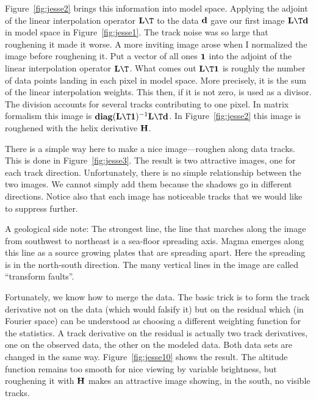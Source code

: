 \par
Figure~\ref{fig:jesse2} brings this information into model space.
Applying the adjoint of the linear interpolation operator $\bold L\T$
to the data $\bold d$ gave our first image $\bold L\T\bold d$
in model space in Figure~\ref{fig:jesse1}.
The track noise was so large that roughening it made it worse.
A more inviting image arose when I normalized the image before roughening it.
Put a vector of all ones $\bold 1$ into the
adjoint of the linear interpolation operator $\bold L\T$.
What comes out $\bold L\T\bold 1$
is roughly the number of data points landing in each pixel in model space.
More precisely, it is the sum of the linear interpolation weights.
This then, if it is not zero, is used as a divisor.
The division accounts for several tracks contributing to one pixel.
In matrix formalism this image is
${\bf diag}(\bold L\T\bold 1)^{-1} \bold L\T\bold d$.
In Figure~\ref{fig:jesse2} this image is roughened
with the helix derivative $\bold H$.


\par
There is a simple way here to make a nice image---roughen
along data tracks.
This is done in
Figure~\ref{fig:jesse3}.
The result is two attractive images, one for each track direction.
Unfortunately, there is no simple relationship between the two images.
We cannot simply add them because the shadows go in different directions.
Notice also that each image has noticeable tracks that we would
like to suppress further.
\par
A geological side note:
The strongest line, the line that marches along the image from
southwest to northeast is a sea-floor spreading axis.
Magma emerges along this line
as a source growing plates that are spreading apart.
Here the spreading is in the north-south direction.
The many vertical lines in the image are called ``transform faults''.

\par
Fortunately, we know how to merge the data.
The basic trick is to form the track derivative
not on the data (which would falsify it)
but on the residual which
(in Fourier space) can be understood as
choosing a different weighting function for the statistics.
A track derivative on the residual is actually two track derivatives,
one on the observed data, the other on the modeled data.
Both data sets are changed in the same way.
Figure~\ref{fig:jesse10} shows the result.
The altitude function remains too smooth for nice viewing
by variable brightness,
but roughening it with $\bold H$ makes an attractive image
showing, in the south, no visible tracks.


